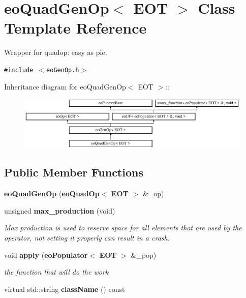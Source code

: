 \section{eo\-Quad\-Gen\-Op$<$ EOT $>$ Class Template Reference}
\label{classeo_quad_gen_op}
Wrapper for quadop: easy as pie.  


{\tt \#include $<$eo\-Gen\-Op.h$>$}

Inheritance diagram for eo\-Quad\-Gen\-Op$<$ EOT $>$::\begin{figure}[H]
\begin{center}
\leavevmode
\includegraphics[height=2.54835cm]{classeo_quad_gen_op}
\end{center}
\end{figure}
\subsection*{Public Member Functions}
\begin{CompactItemize}
\item 
{\bf eo\-Quad\-Gen\-Op} ({\bf eo\-Quad\-Op}$<$ {\bf EOT} $>$ \&\_\-op)\label{classeo_quad_gen_op_a0}

\item 
unsigned {\bf max\_\-production} (void)\label{classeo_quad_gen_op_a1}

\begin{CompactList}\small\item\em Max production is used to reserve space for all elements that are used by the operator, not setting it properly can result in a crash. \item\end{CompactList}\item 
void {\bf apply} ({\bf eo\-Populator}$<$ {\bf EOT} $>$ \&\_\-pop)\label{classeo_quad_gen_op_a2}

\begin{CompactList}\small\item\em the function that will do the work \item\end{CompactList}\item 
virtual std::string {\bf class\-Name} () const \label{classeo_quad_gen_op_a3}

\end{CompactItemize}
